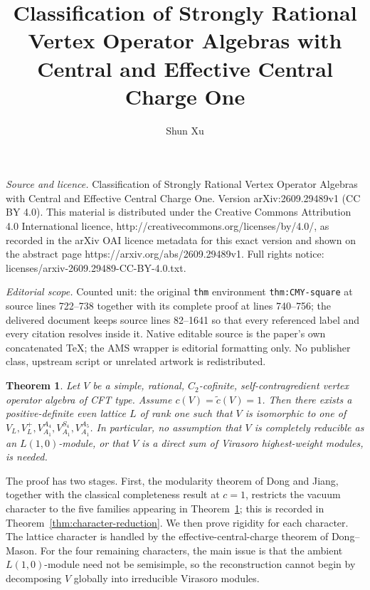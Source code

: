 \documentclass[10pt,a4paper]{amsart}
\numberwithin{equation}{section} \newtheorem{thm}{Theorem}[section] \newtheorem{lem}[thm]{Lemma} \newtheorem{ex}[thm]{Example} \newtheorem{prop}[thm]{Proposition} \newtheorem{cor}[thm]{Corollary} \newtheorem{defi}[thm]{Definition} \newtheorem{rmk}[thm]{Remark} \newtheorem{notation}[thm]{Notation}
\begin{document}
\title[Classification of Strongly Rational Vertex Operator Algebras]{Classification of Strongly Rational Vertex Operator Algebras with Central and Effective Central Charge One}
\author{Shun Xu}
\date{}
\maketitle
\noindent\emph{Source and licence.} Classification of Strongly Rational Vertex Operator Algebras with Central and Effective Central Charge One. Version arXiv:2609.29489v1 (CC BY 4.0). This material is distributed under the Creative Commons Attribution 4.0 International licence, http://creativecommons.org/licenses/by/4.0/, as recorded in the arXiv OAI licence metadata for this exact version and shown on the abstract page https://arxiv.org/abs/2609.29489v1. Full rights notice: licenses/arxiv-2609.29489-CC-BY-4.0.txt.\par\smallskip
\noindent\textit{Editorial scope.} Counted unit: the original \texttt{thm} environment \texttt{thm:CMY-square} at source lines 722--738 together with its complete proof at lines 740--756; the delivered document keeps source lines 82--1641 so that every referenced label and every citation resolves inside it. Native editable source is the paper's own concatenated TeX; the AMS wrapper is editorial formatting only. No publisher class, upstream script or unrelated artwork is redistributed.
\begin{thm}\label{thm:main}
Let $V$ be a simple, rational, $C_2$-cofinite, self-contragredient vertex operator algebra of CFT type. Assume $c(V)=\widetilde c(V)=1$. Then there exists a positive-definite even lattice $L$ of rank one such that $V$ is isomorphic to one of $V_L,V_L^+,V_{A_1}^{A_4},V_{A_1}^{S_4},V_{A_1}^{A_5}$. In particular, no assumption that $V$ is completely reducible as an $L(1,0)$-module, or that $V$ is a direct sum of Virasoro highest-weight modules, is needed.
\end{thm}

The proof has two stages. First, the modularity theorem of Dong and Jiang, together with the classical completeness result at $c=1$, restricts the vacuum character to the five families appearing in Theorem~\ref{thm:main}; this is recorded in Theorem~\ref{thm:character-reduction}. We then prove rigidity for each character. The lattice character is handled by the effective-central-charge theorem of Dong--Mason. For the four remaining characters, the main issue is that the ambient $L(1,0)$-module need not be semisimple, so the reconstruction cannot begin by decomposing $V$ globally into irreducible Virasoro modules.
\end{document}
